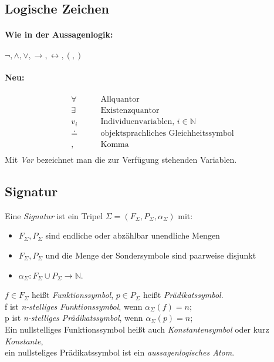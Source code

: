 \documentclass{article}
\begin{document}
\subsection{Logische Zeichen}
\paragraph{Wie in der Aussagenlogik:}
$\lnot, \land, \lor, \rightarrow, \leftrightarrow, (, )$
\paragraph{Neu:} 
\begin{align*}
    \forall \qquad &\text{Allquantor} \\
    \exists  \qquad &\text{Existenzquantor} \\
    v_i  \qquad &\text{Individuenvariablen, } i \in \mathbb{N} \\
    \doteq  \qquad &\text{objektsprachliches Gleichheitssymbol} \\
    ,  \qquad &\text{Komma} \\
\end{align*}
Mit \textit{Var} bezeichnet man die zur Verf\"ugung stehenden Variablen.

\subsection{Signatur}
Eine \textit{Signatur} ist ein Tripel $\Sigma = ( F_\Sigma, P_\Sigma,
\alpha_\Sigma)$ mit:
\begin{itemize}
    \item $F_\Sigma, P_\Sigma$ sind endliche oder
        abz\"ahlbar unendliche Mengen
    \item $F_\Sigma, P_\Sigma$ und die Menge der Sondersymbole
        sind paarweise disjunkt
    \item $\alpha_\Sigma: F_\Sigma \cup P_\Sigma \rightarrow \mathbb{N}$.
\end{itemize}
$f \in F_\Sigma$ hei{\ss}t \textit{Funktionssymbol}, 
$p \in P_\Sigma$ hei{\ss}t \textit{Pr\"adikatssymbol}.\\
f ist \textit{n-stelliges Funktionssymbol}, wenn $\alpha_\Sigma(f) = n$; \\
p ist \textit{n-stelliges Pr\"adikatssymbol}, wenn $\alpha_\Sigma(p) = n$; \\
Ein nullstelliges Funktionssymbol hei{\ss}t auch \textit{Konstantensymbol}
oder kurz \textit{Konstante}, \\
ein nullsteliges Pr\"adikatssymbol ist ein \textit{aussagenlogisches Atom}.
\end{document}
